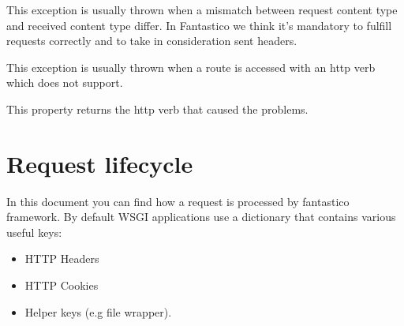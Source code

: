 \documentclass[letterpaper,10pt,english]{sphinxmanual}
\begin{document}

\begin{fulllineitems}
\label{features/exceptions:fantastico.exceptions.FantasticoContentTypeError}
This exception is usually thrown when a mismatch between request content type and received content type differ. In
Fantastico we think it's mandatory to fulfill requests correctly and to take in consideration sent headers.

\end{fulllineitems}


\begin{fulllineitems}
\label{features/exceptions:fantastico.exceptions.FantasticoHttpVerbNotSupported}
This exception is usually thrown when a route is accessed with an http verb which does not support.

\begin{fulllineitems}
\label{features/exceptions:fantastico.exceptions.FantasticoHttpVerbNotSupported.http_verb}
This property returns the http verb that caused the problems.

\end{fulllineitems}


\end{fulllineitems}



\section{Request lifecycle}
\label{features/request_response:request-lifecycle}\label{features/request_response::doc}
In this document you can find how a request is processed by fantastico framework. By default WSGI applications use a dictionary
that contains various useful keys:
\begin{itemize}
\item {} 
HTTP Headers

\item {} 
HTTP Cookies

\item {} 
Helper keys (e.g file wrapper).

\end{itemize}
\end{document}

